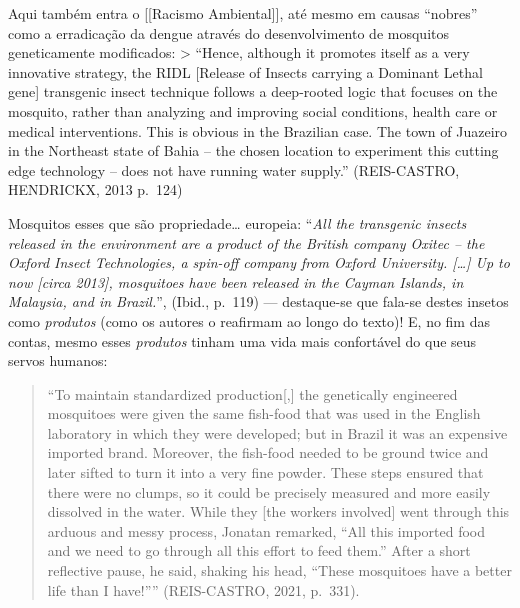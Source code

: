 Aqui também entra o {[}{[}Racismo Ambiental{]}{]}, até mesmo em causas
``nobres'' como a erradicação da dengue através do desenvolvimento de
mosquitos geneticamente modificados: \textgreater{} ``Hence, although it
promotes itself as a very innovative strategy, the RIDL {[}Release of
Insects carrying a Dominant Lethal gene{]} transgenic insect technique
follows a deep-rooted logic that focuses on the mosquito, rather than
analyzing and improving social conditions, health care or medical
interventions. This is obvious in the Brazilian case. The town of
Juazeiro in the Northeast state of Bahia -- the chosen location to
experiment this cutting edge technology -- does not have running water
supply.'' (REIS-CASTRO, HENDRICKX, 2013 p.~124)

Mosquitos esses que são propriedade\ldots{} europeia: ``\emph{All the
transgenic insects released in the environment are a product of the
British company Oxitec -- the Oxford Insect Technologies, a spin-off
company from Oxford University. {[}\ldots{]} Up to now {[}circa 2013{]},
mosquitoes have been released in the Cayman Islands, in Malaysia, and in
Brazil.}'', (Ibid., p.~119) --- destaque-se que fala-se destes insetos
como \emph{produtos} (como os autores o reafirmam ao longo do texto)! E,
no fim das contas, mesmo esses \emph{produtos} tinham uma vida mais
confortável do que seus servos humanos:

\begin{quote}
``To maintain standardized production{[},{]} the genetically engineered
mosquitoes were given the same fish-food that was used in the English
laboratory in which they were developed; but in Brazil it was an
expensive imported brand. Moreover, the fish-food needed to be ground
twice and later sifted to turn it into a very fine powder. These steps
ensured that there were no clumps, so it could be precisely measured and
more easily dissolved in the water. While they {[}the workers
involved{]} went through this arduous and messy process, Jonatan
remarked, ``All this imported food and we need to go through all this
effort to feed them.'' After a short reflective pause, he said, shaking
his head, ``These mosquitoes have a better life than I have!''''
(REIS-CASTRO, 2021, p.~331).
\end{quote}

